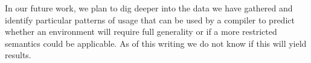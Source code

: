 \documentclass[10pt,review,sigplan,anonymous=true,authorversion=true,nonacm=true]{acmart}
\begin{document}
In our future work, we plan to dig deeper into the data we have gathered and
identify particular patterns of usage that can be used by a compiler to predict
whether an environment will require full generality or if a more restricted
semantics could be applicable. As of this writing we do not know if this will
yield results.


\end{document}
